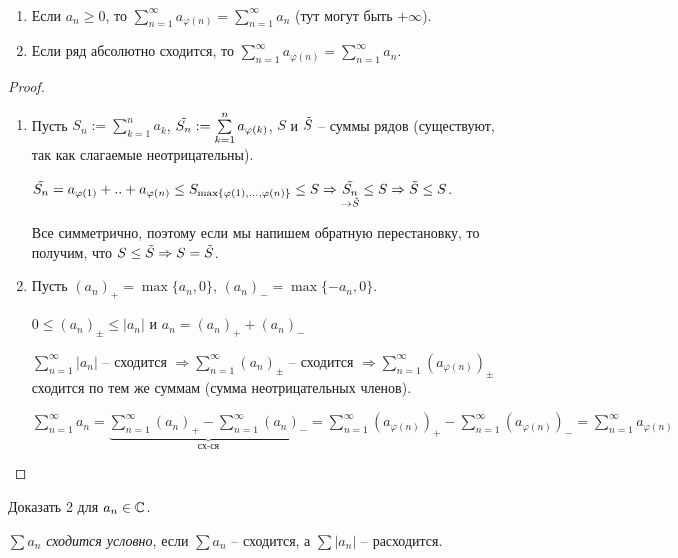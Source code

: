 \begin{theorem}~
    \begin{enumerate}
        \item Если $a_n\geq 0$, то $\sum\limits_{n=1}^\infty a_{\varphi(n)}=\sum\limits_{n=1}^\infty a_n$ (тут могут быть $+\infty$).
        \item Если ряд абсолютно сходится, то $\sum\limits_{n=1}^\infty a_{\varphi(n)}=\sum\limits_{n=1}^\infty a_n$.
    \end{enumerate}
\end{theorem}
\begin{proof}~
    \begin{enumerate}
        \item Пусть $S_n:=\sum\limits_{k=1}^n a_k$, $\Tilde{S_n}:=\sum\limits_{k=1}^n a_{\varphi(k)}$, $S$  и $\Tilde{S}$ – суммы рядов (существуют, так как слагаемые неотрицательны).

        $\Tilde{S_n}=a_{\varphi(1)}+..+a_{\varphi(n)}\leq S_{\max\{\varphi(1), ..., \varphi(n)\}}\leq S\Rightarrow \underset{\rightarrow\Tilde{S}}{\Tilde{S_n}}\leq S\Rightarrow \Tilde{S}\leq S$. 
        
        Все симметрично, поэтому если мы напишем обратную перестановку, то получим, что $S\leq \Tilde{S}\Rightarrow S= \Tilde{S}$.
        \item Пусть $(a_n)_+=\max\{a_n, 0\}$, $(a_n)_-=\max\{-a_n, 0\}$.

        $0\leq (a_n)_\pm \leq |a_n|$ и $a_n=(a_n)_++(a_n)_-$

        $\sum\limits_{n=1}^\infty |a_n|$ – сходится $\Rightarrow\sum\limits_{n=1}^\infty (a_n)_\pm$ – сходится $\Rightarrow \sum\limits_{n=1}^\infty (a_{\varphi(n)})_\pm$ сходится по тем же суммам (сумма неотрицательных членов).

        $\sum\limits_{n=1}^\infty a_n=\underbrace{\sum\limits_{n=1}^\infty (a_n)_+-\sum\limits_{n=1}^\infty (a_n)_-}_{\text{сх-ся}}=\sum\limits_{n=1}^\infty (a_{\varphi(n)})_+-\sum\limits_{n=1}^\infty (a_{\varphi(n)})_-=\sum\limits_{n=1}^\infty a_{\varphi(n)}$
    \end{enumerate}
\end{proof}

\begin{exercise}
    Доказать 2 для $a_n\in \mathbb{C}$.
\end{exercise}

\begin{definition}
    $\sum a_n$ \textit{сходится условно}, если $\sum a_n$ – сходится, а $\sum |a_n|$ – расходится.
\end{definition}

